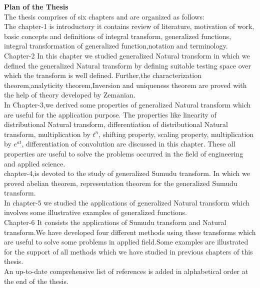 \begin{large}
\textbf{Plan of the Thesis}\\
The thesis comprises of six chapters and are organized as follows:\\
The chapter-1 is introductory it contains review of literature, motivation of work, basic concepts and definitions of integral transform, generalized functions, integral transformation of generalized function,notation and terminology.\\
Chapter-2 In this chapter we studied generalized Natural transform in which we defined the generalized Natural transform by defining suitable testing space over which the transform is well defined. Further,the characterization theorem,analyticity theorem,Inversion and uniqueness theorem are proved with the help of theory developed by Zemanian\cite{R97}.\\
In Chapter-3,we derived some properties of generalized Natural transform which are useful for the application purpose. The properties like linearity of distributional Natural transform, differentiation of distributional Natural transform, multiplication by $ t^{n} $, shifting property, scaling property,  multiplication by $ e^{at} $, differentiation of convolution are discussed in this chapter. These all properties are useful to solve the problems occurred in the field of engineering and applied science.\\
chapter-4,is devoted to the study of generalized Sumudu transform. In which we proved abelian theorem,  representation theorem for the generalized Sumudu transform.\\
In chapter-5 we studied the applications of generalized Natural transform which involves some illustrative examples of generalized functions.\\
Chapter-6 It consists the applications of Sumudu transform and Natural transform.We have developed four different methods using these transforms which are useful to solve some problems in applied field.Some examples are illustrated for the support of all methods which we have studied in previous chapters of this thesis.\\
An up-to-date comprehensive list of references is added in alphabetical
order at the end of the thesis.

\end{large}


